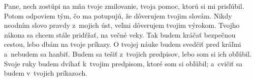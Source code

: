 Pane, nech zostúpi na mňa tvoje zmilovanie,
tvoja pomoc, ktorú si mi prisľúbil.
\versseparator
Potom odpoviem tým, čo ma potupujú,
že dôverujem tvojim slovám.
\versseparator
Nikdy neodním slovo pravdy z~mojich úst,
veľmi dôverujem tvojim výrokom.
\versseparator
Tvojho zákona sa chcem stále pridŕžať,
na večné veky.
\versseparator
Tak budem kráčať bezpečnou cestou,
lebo dbám na tvoje príkazy.
\versseparator
O tvojej náuke budem svedčiť pred kráľmi
a~nebudem sa hanbiť.
\versseparator
Budem sa tešiť z~tvojich predpisov,
lebo som si ich obľúbil.
\versseparator
Svoje ruky budem dvíhať k~tvojim predpisom, ktoré som si obľúbil;
a~cvičiť sa budem v~tvojich príkazoch.